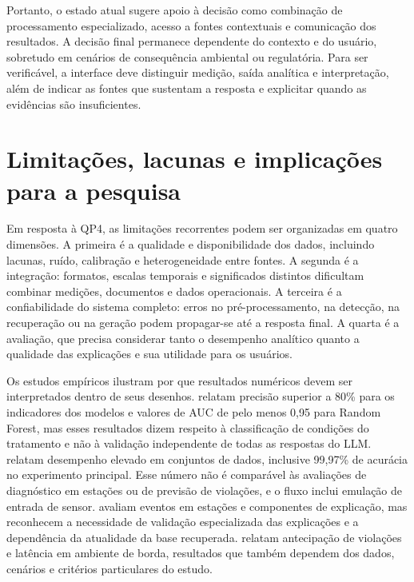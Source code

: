 Portanto, o estado atual sugere apoio à decisão como combinação de processamento especializado, acesso a fontes contextuais e comunicação dos resultados. A decisão final permanece dependente do contexto e do usuário, sobretudo em cenários de consequência ambiental ou regulatória. Para ser verificável, a interface deve distinguir medição, saída analítica e interpretação, além de indicar as fontes que sustentam a resposta e explicitar quando as evidências são insuficientes.

\section{Limitações, lacunas e implicações para a pesquisa}
\label{sec:ea-limitacoes-lacunas}

Em resposta à QP4, as limitações recorrentes podem ser organizadas em quatro dimensões. A primeira é a qualidade e disponibilidade dos dados, incluindo lacunas, ruído, calibração e heterogeneidade entre fontes. A segunda é a integração: formatos, escalas temporais e significados distintos dificultam combinar medições, documentos e dados operacionais. A terceira é a confiabilidade do sistema completo: erros no pré-processamento, na detecção, na recuperação ou na geração podem propagar-se até a resposta final. A quarta é a avaliação, que precisa considerar tanto o desempenho analítico quanto a qualidade das explicações e sua utilidade para os usuários.

Os estudos empíricos ilustram por que resultados numéricos devem ser interpretados dentro de seus desenhos.  relatam precisão superior a 80\% para os indicadores dos modelos e valores de AUC de pelo menos 0,95 para Random Forest, mas esses resultados dizem respeito à classificação de condições do tratamento e não à validação independente de todas as respostas do LLM.  relatam desempenho elevado em conjuntos de dados, inclusive 99,97\% de acurácia no experimento principal. Esse número não é comparável às avaliações de diagnóstico em estações ou de previsão de violações, e o fluxo inclui emulação de entrada de sensor.  avaliam eventos em estações e componentes de explicação, mas reconhecem a necessidade de validação especializada das explicações e a dependência da atualidade da base recuperada.  relatam antecipação de violações e latência em ambiente de borda, resultados que também dependem dos dados, cenários e critérios particulares do estudo.

